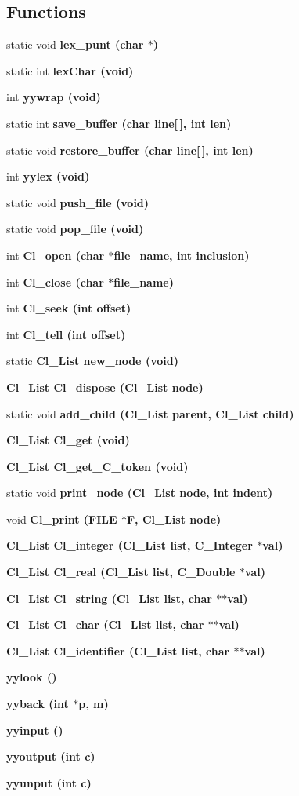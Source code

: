 \subsection*{Functions}
\begin{CompactItemize}
\item 
static void \bf{lex\_\-punt} (char $\ast$)
\item 
static int \bf{lex\-Char} (void)
\item 
int \bf{yywrap} (void)
\item 
static int \bf{save\_\-buffer} (char line[$\,$], int len)
\item 
static void \bf{restore\_\-buffer} (char line[$\,$], int len)
\item 
int \bf{yylex} (void)
\item 
static void \bf{push\_\-file} (void)
\item 
static void \bf{pop\_\-file} (void)
\item 
int \bf{Cl\_\-open} (char $\ast$file\_\-name, int inclusion)
\item 
int \bf{Cl\_\-close} (char $\ast$file\_\-name)
\item 
int \bf{Cl\_\-seek} (int offset)
\item 
int \bf{Cl\_\-tell} (int offset)
\item 
static \bf{Cl\_\-List} \bf{new\_\-node} (void)
\item 
\bf{Cl\_\-List} \bf{Cl\_\-dispose} (\bf{Cl\_\-List} \bf{node})
\item 
static void \bf{add\_\-child} (\bf{Cl\_\-List} parent, \bf{Cl\_\-List} child)
\item 
\bf{Cl\_\-List} \bf{Cl\_\-get} (void)
\item 
\bf{Cl\_\-List} \bf{Cl\_\-get\_\-C\_\-token} (void)
\item 
static void \bf{print\_\-node} (\bf{Cl\_\-List} \bf{node}, int indent)
\item 
void \bf{Cl\_\-print} (FILE $\ast$\bf{F}, \bf{Cl\_\-List} \bf{node})
\item 
\bf{Cl\_\-List} \bf{Cl\_\-integer} (\bf{Cl\_\-List} \bf{list}, \bf{C\_\-Integer} $\ast$val)
\item 
\bf{Cl\_\-List} \bf{Cl\_\-real} (\bf{Cl\_\-List} \bf{list}, \bf{C\_\-Double} $\ast$val)
\item 
\bf{Cl\_\-List} \bf{Cl\_\-string} (\bf{Cl\_\-List} \bf{list}, char $\ast$$\ast$val)
\item 
\bf{Cl\_\-List} \bf{Cl\_\-char} (\bf{Cl\_\-List} \bf{list}, char $\ast$$\ast$val)
\item 
\bf{Cl\_\-List} \bf{Cl\_\-identifier} (\bf{Cl\_\-List} \bf{list}, char $\ast$$\ast$val)
\item 
\bf{yylook} ()
\item 
\bf{yyback} (int $\ast$p, m)
\item 
\bf{yyinput} ()
\item 
\bf{yyoutput} (int c)
\item 
\bf{yyunput} (int c)
\end{CompactItemize}
